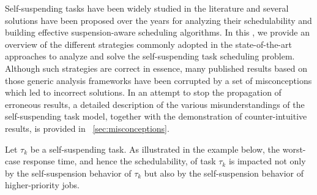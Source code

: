 
\label{sec:review}

Self-suspending tasks have been widely studied in the literature and several solutions have been proposed over the years for 
analyzing their schedulability and building effective suspension-aware scheduling algorithms. In this \mysectionrefnormal{}, we provide an overview of the different 
strategies commonly adopted in the state-of-the-art approaches to analyze and solve the self-suspending task scheduling problem. Although such strategies are
correct in essence, many published results based on those generic analysis frameworks have been corrupted by a set of 
misconceptions which led to incorrect solutions. In an attempt to stop the propagation of erroneous results, a detailed 
description of the various misunderstandings of the self-suspending task model, together with the demonstration of 
counter-intuitive results, is provided in \mysectionref{}~\ref{sec:misconceptions}.

Let $\tau_k$ be a self-suspending task.
As illustrated in the example below, the worst-case response time, and hence the schedulability, of task $\tau_k$ is impacted not only by 
the self-suspension behavior of $\tau_k$ but also by the self-suspension behavior of  higher-priority jobs.


